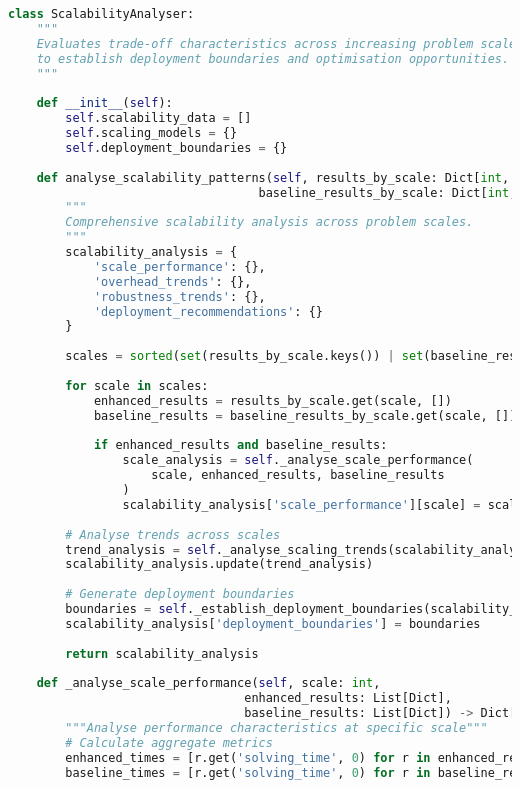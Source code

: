 \begin{lstlisting}[language=Python, caption=Scalability Analysis for Deployment Planning]
class ScalabilityAnalyser:
    """
    Evaluates trade-off characteristics across increasing problem scales
    to establish deployment boundaries and optimisation opportunities.
    """
    
    def __init__(self):
        self.scalability_data = []
        self.scaling_models = {}
        self.deployment_boundaries = {}
    
    def analyse_scalability_patterns(self, results_by_scale: Dict[int, List[Dict]], 
                                   baseline_results_by_scale: Dict[int, List[Dict]]) -> Dict[str, Any]:
        """
        Comprehensive scalability analysis across problem scales.
        """
        scalability_analysis = {
            'scale_performance': {},
            'overhead_trends': {},
            'robustness_trends': {},
            'deployment_recommendations': {}
        }
        
        scales = sorted(set(results_by_scale.keys()) | set(baseline_results_by_scale.keys()))
        
        for scale in scales:
            enhanced_results = results_by_scale.get(scale, [])
            baseline_results = baseline_results_by_scale.get(scale, [])
            
            if enhanced_results and baseline_results:
                scale_analysis = self._analyse_scale_performance(
                    scale, enhanced_results, baseline_results
                )
                scalability_analysis['scale_performance'][scale] = scale_analysis
        
        # Analyse trends across scales
        trend_analysis = self._analyse_scaling_trends(scalability_analysis['scale_performance'])
        scalability_analysis.update(trend_analysis)
        
        # Generate deployment boundaries
        boundaries = self._establish_deployment_boundaries(scalability_analysis)
        scalability_analysis['deployment_boundaries'] = boundaries
        
        return scalability_analysis
    
    def _analyse_scale_performance(self, scale: int, 
                                 enhanced_results: List[Dict],
                                 baseline_results: List[Dict]) -> Dict[str, Any]:
        """Analyse performance characteristics at specific scale"""
        # Calculate aggregate metrics
        enhanced_times = [r.get('solving_time', 0) for r in enhanced_results if r.get('satisfiable', False)]
        baseline_times = [r.get('solving_time', 0) for r in baseline_results if r.get('satisfiable', False)]
        

\end{lstlisting}
